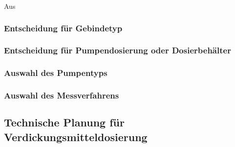 Aus 

\subsubsection{Entscheidung für Gebindetyp}

\subsubsection{Entscheidung für Pumpendosierung oder Dosierbehälter}

\subsubsection{Auswahl des Pumpentyps}


\subsubsection{Auswahl des Messverfahrens}

\subsection{Technische Planung für Verdickungsmitteldosierung}
